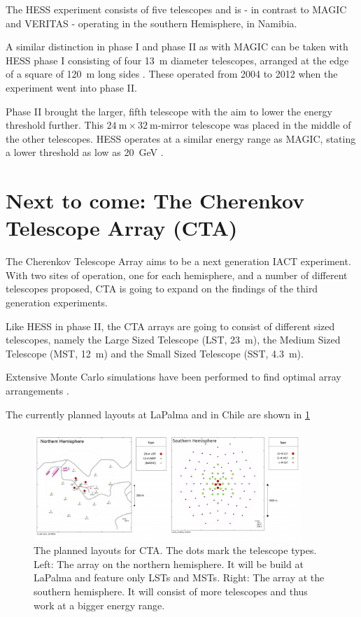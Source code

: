 The HESS experiment consists of five telescopes and 
is - in contrast to MAGIC and VERITAS - operating in the southern 
Hemisphere, in Namibia.

A similar distinction in phase I and phase II as with MAGIC can be taken with 
HESS phase I consisting of four \SI{13}{\meter} diameter telescopes,
arranged at the edge of a square of \SI{120}{\meter} long sides \cite{HINTON2004331}.
These operated from 2004 to 2012 when the experiment went into phase II.

Phase II brought the larger, fifth telescope with the aim to lower the energy threshold
further. This $\SI{24}{\meter} \times \SI{32}{\meter}$-mirror telescope 
was placed in the middle of the other telescopes.
HESS operates at a similar energy range as MAGIC, stating a lower threshold as low as 
\SI{20}{\giga\electronvolt} \cite{vincent2005hess}.


\section{Next to come: The Cherenkov Telescope Array (CTA)}
\label{sec:cta}

The Cherenkov Telescope Array aims to be a next generation IACT experiment.
With two sites of operation, one for each hemisphere, and a number of different 
telescopes proposed, CTA is going to expand on the findings of the third 
generation experiments.

Like HESS in phase II, the CTA arrays are going to consist of different sized telescopes, namely
the Large Sized Telescope (LST, \SI{23}{\meter}), 
the Medium Sized Telescope (MST, \SI{12}{\meter}) 
and the Small Sized Telescope (SST, \SI{4.3}{\meter}).

Extensive Monte Carlo simulations have been performed to find optimal array arrangements
\cite{BERNLOHR2013171}.

The currently planned layouts at LaPalma and in Chile are shown in 
\ref{fig:cta_layout}

\begin{figure}[H]
	\center
	\captionsetup{width=0.9\linewidth}
	\includegraphics[width=0.9\textwidth]{images/cta_layout.png}
	\caption{The planned layouts for CTA. The dots mark the telescope types.
	Left: The array on the northern hemisphere. It will be build at LaPalma
	and feature only LSTs and MSTs.
	Right: The array at the southern hemisphere.
	It will consist of more telescopes and thus 
	work at a bigger energy range.
	\cite{cta_web}}
	\label{fig:cta_layout}
\end{figure}

